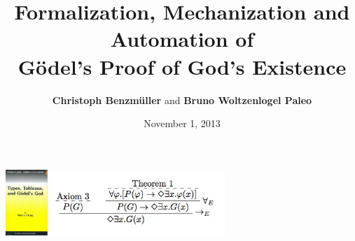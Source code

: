 \documentclass[9pt,mathserif,handout]{beamer}
\title[On G\"{o}del's Proof of God's
Existence]{Formalization, Mechanization and Automation of \\ G\"{o}del's
  Proof of God's Existence}
\author{\textbf{Christoph Benzm\"{u}ller} and \textbf{Bruno Woltzenlogel Paleo}}
\date[1.11.2013]{November 1, 2013}
\begin{document}
\begin{frame}
  \titlepage
\includegraphics[height=2.5cm]{buch7.jpg} 
\hfill
\includegraphics[height=2.5cm]{nd.jpg}
\end{frame}












\end{document}
